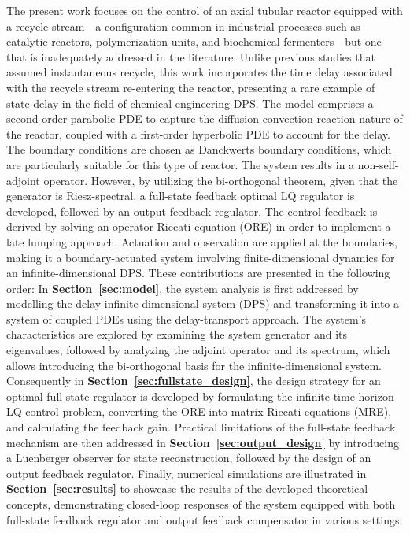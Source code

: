 The present work focuses on the control of an axial tubular reactor equipped with a recycle stream—a configuration common in industrial processes such as catalytic reactors, polymerization units, and biochemical fermenters—but one that is inadequately addressed in the literature. Unlike previous studies that assumed instantaneous recycle, this work incorporates the time delay associated with the recycle stream re-entering the reactor, presenting a rare example of state-delay in the field of chemical engineering DPS. The model comprises a second-order parabolic PDE to capture the diffusion-convection-reaction nature of the reactor, coupled with a first-order hyperbolic PDE to account for the delay. The boundary conditions are chosen as Danckwerts boundary conditions, which are particularly suitable for this type of reactor. The system results in a non-self-adjoint operator. However, by utilizing the bi-orthogonal theorem, given that the generator is Riesz-spectral, a full-state feedback optimal LQ regulator is developed, followed by an output feedback regulator. The control feedback is derived by solving an operator Riccati equation (ORE) in order to implement a late lumping approach. Actuation and observation are applied at the boundaries, making it a boundary-actuated system involving finite-dimensional dynamics for an infinite-dimensional DPS. These contributions are presented in the following order: In \textbf{Section~\ref{sec:model}}, the system analysis is first addressed by modelling the delay infinite-dimensional system (DPS) and transforming it into a system of coupled PDEs using the delay-transport approach. The system's characteristics are explored by examining the system generator and its eigenvalues, followed by analyzing the adjoint operator and its spectrum, which allows introducing the bi-orthogonal basis for the infinite-dimensional system. Consequently in \textbf{Section~\ref{sec:fullstate_design}}, the design strategy for an optimal full-state regulator is developed by formulating the infinite-time horizon LQ control problem, converting the ORE into matrix Riccati equations (MRE), and calculating the feedback gain. Practical limitations of the full-state feedback mechanism are then addressed in \textbf{Section~\ref{sec:output_design}} by introducing a Luenberger observer for state reconstruction, followed by the design of an output feedback regulator. Finally, numerical simulations are illustrated in \textbf{Section~\ref{sec:results}} to showcase the results of the developed theoretical concepts, demonstrating closed-loop responses of the system equipped with both full-state feedback regulator and output feedback compensator in various settings.